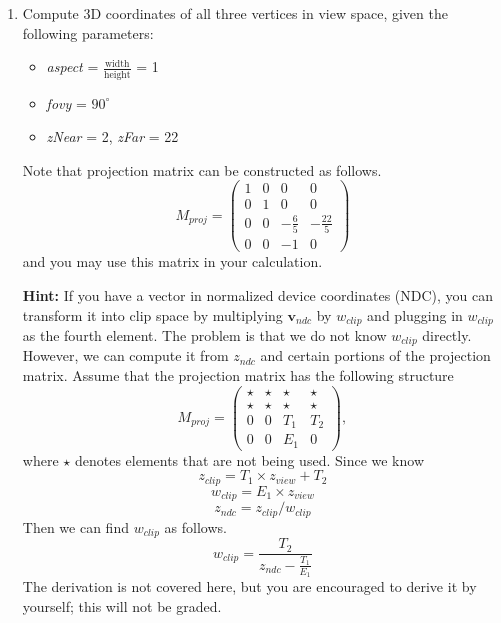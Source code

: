 \documentclass[conference]{styles/acmsiggraph}
\renewcommand{\vec}[1]{\mathbf{#1}}
\newcommand{\points}[1]{\hfill \normalfont{(\textit{#1pts})}}
\begin{document}
\begin{enumerate}[label=(\roman*)]
\itemsep1em
\item Compute 3D coordinates of all three vertices in view space, given the following parameters: \points{15}
\begin{itemize}
\item \textit{aspect} = $\frac{\text{width}}{\text{height}}$ = 1
\item \textit{fovy} = $90^\circ$
\item \textit{zNear} = 2, \textit{zFar} = 22
\end{itemize}
Note that projection matrix can be constructed as follows.
$$M_{proj} = \begin{pmatrix}
1 & 0 & 0 & 0 \\
0 & 1 & 0 & 0 \\
0 & 0 & -\frac{6}{5} & -\frac{22}{5} \\
0 & 0 & -1 & 0
\end{pmatrix}$$
%
and you may use this matrix in your calculation.

\textbf{Hint:} If you have a vector in normalized device coordinates (NDC), you can transform it into clip space by
multiplying $\vec{v}_{ndc}$ by $w_{clip}$ and plugging in $w_{clip}$ as the fourth element. The problem is that we do not know $w_{clip}$ directly. However, we can compute it from $z_{ndc}$ and certain portions of the projection matrix. Assume that the projection matrix has the following structure
%
$$M_{proj} = \begin{pmatrix}
\star & \star & \star & \star \\
\star & \star & \star & \star \\
0 & 0 & T_1 & T_2 \\
0 & 0 & E_1 & 0
\end{pmatrix},$$
%
where $\star$ denotes elements that are not being used. Since we know
%
$$z_{clip} = T_1\times z_{view} + T_2$$
$$w_{clip} = E_1\times z_{view}$$
$$z_{ndc} = z_{clip} / w_{clip}$$
Then we can find $w_{clip}$ as follows.
$$w_{clip} = \frac{T_2}{z_{ndc} - \frac{T_1}{E_1}}$$
%
The derivation is not covered here, but you are encouraged to derive it by yourself; this will not be graded.


\end{enumerate}
\end{document}
